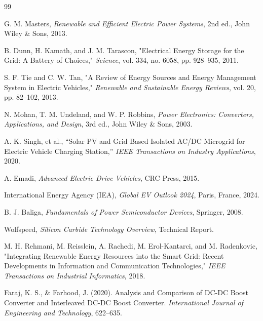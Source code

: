 \renewcommand{\bibname}{References}

\begin{thebibliography}{99}

G. M. Masters,
\textit{Renewable and Efficient Electric Power Systems},
2nd ed., John Wiley \& Sons, 2013.

B. Dunn, H. Kamath, and J. M. Tarascon,
"Electrical Energy Storage for the Grid: A Battery of Choices,"
\textit{Science},
vol. 334, no. 6058, pp. 928--935, 2011.

S. F. Tie and C. W. Tan,
"A Review of Energy Sources and Energy Management System in Electric Vehicles,"
\textit{Renewable and Sustainable Energy Reviews},
vol. 20, pp. 82--102, 2013.

 N. Mohan, T. M. Undeland, and W. P. Robbins, \textit{Power Electronics: Converters, Applications, and Design}, 3rd ed., John Wiley \& Sons, 2003.

 A. K. Singh, et al., ``Solar PV and Grid Based Isolated AC/DC Microgrid for Electric Vehicle Charging Station,'' \textit{IEEE Transactions on Industry Applications}, 2020.

A. Emadi,
\textit{Advanced Electric Drive Vehicles},
CRC Press, 2015.

International Energy Agency (IEA),
\textit{Global EV Outlook 2024},
Paris, France, 2024.

B. J. Baliga,
\textit{Fundamentals of Power Semiconductor Devices},
Springer, 2008.

Wolfspeed,
\textit{Silicon Carbide Technology Overview},
Technical Report.

M. H. Rehmani, M. Reisslein, A. Rachedi, M. Erol-Kantarci, and M. Radenkovic,
"Integrating Renewable Energy Resources into the Smart Grid: Recent Developments in Information and Communication Technologies,"
\textit{IEEE Transactions on Industrial Informatics},
2018.

Faraj, K. S., \& Farhood, J. (2020). Analysis and Comparison of DC-DC Boost Converter and Interleaved DC-DC Boost Converter. \textit{International Journal of Engineering and Technology}, 622--635.

\end{thebibliography}